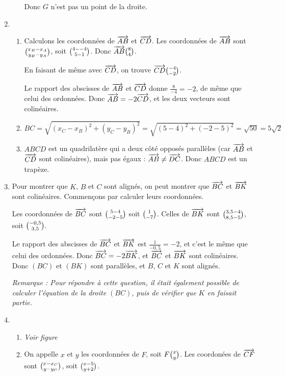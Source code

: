 \documentclass[12pt]{article}
\begin{document}
\begin{exercice}
\begin{enumerate}
\begin{enumerate}
          Donc $G$ n'est pas un point de la droite.
      \end{enumerate}
    \item \begin{enumerate}
        \item Calculons les coordonnées de $\overrightarrow{AB}$ et $\overrightarrow{CD}$. Les coordonnées de $\overrightarrow{AB}$ sont $\binom{x_B-x_A}{y_B-y_A}$, soit $\binom{4--4}{5-1}$. Donc $\overrightarrow{AB}\binom{8}{4}$.

      En faisant de même avec $\overrightarrow{CD}$, on trouve $\overrightarrow{CD}\binom{-4}{-2}$.

      Le rapport des abscisses de $\overrightarrow{AB}$ et $\overrightarrow{CD}$ donne $\frac{8}{-4}=-2$, de même que celui des ordonnées. Donc $\overrightarrow{AB}=-2\overrightarrow{CD}$, et les deux vecteurs sont colinéaires.
    \item $BC=\sqrt{(x_C-x_B)^2+(y_C-y_B)^2}=\sqrt{(5-4)^2+(-2-5)^2}=\sqrt{50}=5\sqrt{2}$
    \item $ABCD$ est un quadrilatère qui a deux côté opposés parallèles (car
      $\overrightarrow{AB}$ et $\overrightarrow{CD}$ sont colinéaires), mais pas égaux :
      $\overrightarrow{AB}\neq\overrightarrow{DC}$. Donc $ABCD$ est un trapèze.
  \end{enumerate}
\item Pour montrer que $K$, $B$ et $C$ sont alignés, on peut montrer que $\overrightarrow{BC}$ et $\overrightarrow{BK}$ sont colinéaires. Commençons par calculer leurs coordonnées.

  Les coordonnées de $\overrightarrow{BC}$ sont $\binom{5-4}{-2-5}$ soit $\binom{1}{-7}$. Celles de $\overrightarrow{BK}$ sont $\binom{3,5-4}{8,5-5}$, soit $\binom{-0,5}{3,5}$.

  Le rapport des abscisses de $\overrightarrow{BC}$ et $\overrightarrow{BK}$ est $\frac{1}{-0,5}=-2$, et c'est le même que celui des ordonnées. Donc $\overrightarrow{BC}=-2\overrightarrow{BK}$, et $\overrightarrow{BC}$ et $\overrightarrow{BK}$ sont colinéaires. Donc $(BC)$ et $(BK)$ sont parallèles, et $B$, $C$ et $K$ sont alignés.

  \emph{Remarque : Pour répondre à cette question, il était également possible de calculer l'équation de la droite $(BC)$, puis de vérifier que $K$ en faisait partie.}
\item 
  \begin{enumerate}
    \item \emph{Voir figure}
    \item On appelle $x$ et $y$ les coordonnées de $F$, soit $F\binom{x}{y}$. Les coordonées de $\overrightarrow{CF}$ sont $\binom{x-x_C}{y-y_C}$, soit $\binom{x-5}{y+2}$.


\end{enumerate}
\end{enumerate}
\end{exercice}
\end{document}
